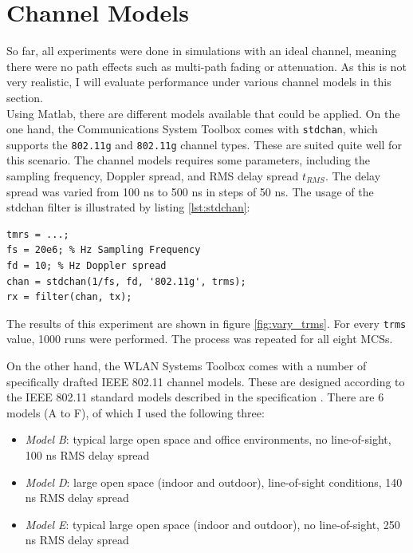 
\section{Channel Models}

So far, all experiments were done in simulations with an ideal channel, meaning there were no path effects such as multi-path fading or attenuation. As this is not very realistic, I will evaluate performance under various channel models in this section.\\

Using Matlab, there are different models available that could be applied. On the one hand, the Communications System Toolbox comes with \texttt{stdchan}, which supports the \texttt{802.11g} and \texttt{802.11g} channel types. These are suited quite well for this scenario. The channel models requires some parameters, including the sampling frequency, Doppler spread, and \gls{RMS} delay spread $ t_{RMS} $. The delay spread was varied from 100 ns to 500 ns in steps of 50 ns. The usage of the stdchan filter is illustrated by listing \ref{lst:stdchan}:

\begin{lstlisting}[captionpos=b,caption={Matlab stdchan Channel Model},label=lst:stdchan]
tmrs = ...;
fs = 20e6; % Hz Sampling Frequency
fd = 10; % Hz Doppler spread
chan = stdchan(1/fs, fd, '802.11g', trms);
rx = filter(chan, tx);
\end{lstlisting}

The results of this experiment are shown in figure \ref{fig:vary_trms}. For every \texttt{trms} value, 1000 runs were performed. The process was repeated for all eight \glspl{MCS}.

On the other hand, the WLAN Systems Toolbox comes with a number of specifically drafted IEEE 802.11 channel models. These are designed according to the IEEE 802.11 standard models described in the specification \cite{ieee2012}. There are 6 models (A to F), of which I used the following three:

\begin{itemize}
	\item \textit{Model B}: typical large open space and office environments, no line-of-sight, 100 ns \gls{RMS} delay spread
	\item \textit{Model D}: large open space (indoor and outdoor), line-of-sight conditions, 140 ns \gls{RMS} delay spread
	\item \textit{Model E}: typical large open space (indoor and outdoor), no line-of-sight, 250 ns \gls{RMS} delay spread
\end{itemize}

